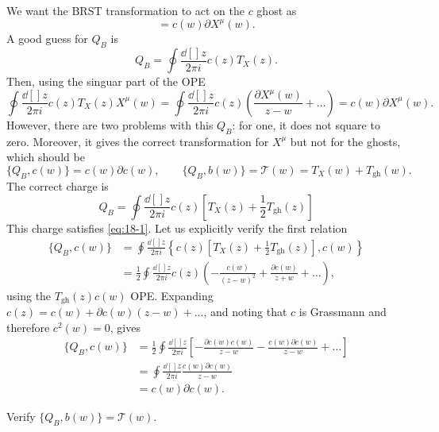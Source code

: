 We want the BRST transformation to act on the $c$ ghost as
\begin{equation}
  [Q_B , X^{\mu}(w)] = c(w) \partial X^{\mu}(w).
\end{equation}
A good guess for $Q_B$ is
\begin{equation}
  Q_B = \oint \frac{\dd[]{z}}{2 \pi i} c(z) T_X (z).
\end{equation}
Then, using the singuar part of the OPE
\begin{equation}
  \oint \frac{\dd[]{z}}{2 \pi i} c(z) T_X(z) X^{\mu}(w) = \oint \frac{\dd[]{z}}{2 \pi i} c(z) \left( \frac{\partial X^{\mu}(w)}{z - w} + \dots \right) = c(w) \partial X^{\mu}(w).
\end{equation}
However, there are two problems with this $Q_B$: for one, it does not square to zero. Moreover, it gives the correct transformation for $X^{\mu}$ but not for the ghosts, which should be
\begin{equation}
  \label{eq:18-1}
  \{Q_B, c(w)\} = c(w) \partial c(w), \qquad \{Q_B, b(w)\} = \mathcal{T}(w) = T_X(w) + T_{\text{gh}}(w).
\end{equation}
The correct charge is
\begin{equation}
  \boxed{Q_B = \oint \frac{\dd[]{z}}{2 \pi i} c(z) \left[ T_X(z) + \frac{1}{2} T_{\text{gh}}(z) \right]}
\end{equation}
This charge satisfies \eqref{eq:18-1}.
Let us explicitly verify the first relation
\begin{align}
  \{Q_B, c(w)\} &= \oint \frac{\dd[]{z}}{2 \pi i} \left\{c(z) \left[ T_X (z) + \frac{1}{2} T_{\text{gh}}(z) \right],  c(w)\right\} \\
		&= \frac{1}{2} \oint \frac{\dd[]{z}}{2 \pi i} c(z) \left( - \frac{c(w)}{(z - w)^2} + \frac{\partial c(w)}{z + w} + \dots \right),
\end{align}
using the $T_{\text{gh}}(z) c(w)$ OPE.
Expanding $c(z) = c(w) + \partial c (w) (z - w) + \dots$, and noting that $c$ is Grassmann and therefore $c^2(w) = 0$, gives
\begin{align}
  \{Q_B, c(w)\} &= \frac{1}{2} \oint \frac{\dd[]{z}}{2 \pi i} \left[ -\frac{ \partial c (w) c(w)}{z - w} - \frac{c(w) \partial c(w)}{z - w} + \dots \right] \\
		&= \oint \frac{\dd[]{z}}{2 \pi i} \frac{c(w) \partial c(w)}{ z - w} \\
		&= c(w) \partial c(w).
\end{align}
\begin{exercise}
  Verify $\{Q_B, b(w)\} = \mathcal{T}(w)$.
\end{exercise}

